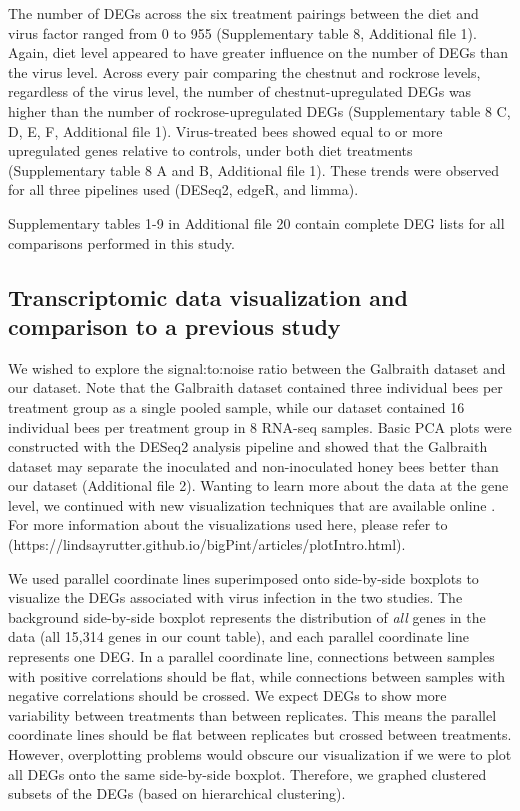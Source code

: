 \documentclass{bmcart}
\begin{document}
\begin{linenumbers}
\begin{doublespacing}
The number of DEGs across the six treatment pairings between the diet and virus factor ranged from 0 to 955 (Supplementary table 8, Additional file 1). Again, diet level appeared to have greater influence on the number of DEGs than the virus level. Across every pair comparing the chestnut and rockrose levels, regardless of the virus level, the number of chestnut-upregulated DEGs was higher than the number of rockrose-upregulated DEGs (Supplementary table 8 C, D, E, F, Additional file 1). Virus-treated bees showed equal to or more upregulated genes relative to controls, under both diet treatments (Supplementary table 8 A and B, Additional file 1). These trends were observed for all three pipelines used (DESeq2, edgeR, and limma).

Supplementary tables 1-9 in Additional file 20 contain complete DEG lists for all comparisons performed in this study. 

\subsection*{Transcriptomic data visualization and comparison to a previous study}

We wished to explore the signal:to:noise ratio between the Galbraith dataset and our dataset. Note that the Galbraith dataset contained three individual bees per treatment group as a single pooled sample, while our dataset contained 16 individual bees per treatment group in 8 RNA-seq samples. Basic PCA plots were constructed with the DESeq2 analysis pipeline and showed that the Galbraith dataset may separate the inoculated and non-inoculated honey bees better than our dataset (Additional file 2). Wanting to learn more about the data at the gene level, we continued with new visualization techniques that are available online \cite{bigpint}. For more information about the visualizations used here, please refer to (https://lindsayrutter.github.io/bigPint/articles/plotIntro.html).

We used parallel coordinate lines superimposed onto side-by-side boxplots to visualize the DEGs associated with virus infection in the two studies. The background side-by-side boxplot represents the distribution of \textit{all} genes in the data (all 15,314 genes in our count table), and each parallel coordinate line represents one DEG. In a parallel coordinate line, connections between samples with positive correlations should be flat, while connections between samples with negative correlations should be crossed. We expect DEGs to show more variability between treatments than between replicates. This means the parallel coordinate lines should be flat between replicates but crossed between treatments. However, overplotting problems would obscure our visualization if we were to plot all DEGs onto the same side-by-side boxplot. Therefore, we graphed clustered subsets of the DEGs (based on hierarchical clustering).


\end{doublespacing}
\end{linenumbers}
\end{document}
